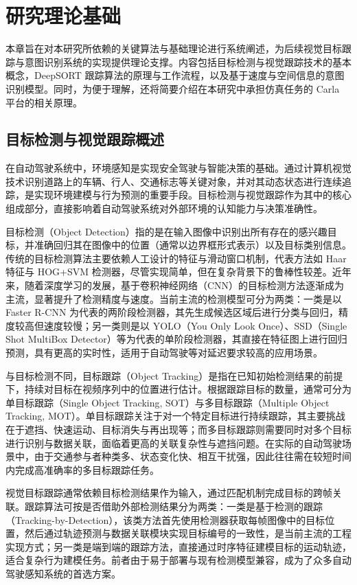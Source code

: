 \chapter{研究理论基础}

本章旨在对本研究所依赖的关键算法与基础理论进行系统阐述，为后续视觉目标跟踪与意图识别系统的实现提供理论支撑。内容包括目标检测与视觉跟踪技术的基本概念，DeepSORT 跟踪算法的原理与工作流程，以及基于速度与空间信息的意图识别模型。同时，为便于理解，还将简要介绍在本研究中承担仿真任务的 Carla 平台的相关原理。

\section{目标检测与视觉跟踪概述}

在自动驾驶系统中，环境感知是实现安全驾驶与智能决策的基础。通过计算机视觉技术识别道路上的车辆、行人、交通标志等关键对象，并对其动态状态进行连续追踪，是实现环境建模与行为预测的重要手段。目标检测与视觉跟踪作为其中的核心组成部分，直接影响着自动驾驶系统对外部环境的认知能力与决策准确性。

目标检测（Object Detection）指的是在输入图像中识别出所有存在的感兴趣目标，并准确回归其在图像中的位置（通常以边界框形式表示）以及目标类别信息。传统的目标检测算法主要依赖人工设计的特征与滑动窗口机制，代表方法如 Haar 特征与 HOG+SVM 检测器，尽管实现简单，但在复杂背景下的鲁棒性较差。近年来，随着深度学习的发展，基于卷积神经网络（CNN）的目标检测方法逐渐成为主流，显著提升了检测精度与速度。当前主流的检测模型可分为两类：一类是以 Faster R-CNN 为代表的两阶段检测器，其先生成候选区域后进行分类与回归，精度较高但速度较慢；另一类则是以 YOLO（You Only Look Once）、SSD（Single Shot MultiBox Detector）等为代表的单阶段检测器，其直接在特征图上进行回归预测，具有更高的实时性，适用于自动驾驶等对延迟要求较高的应用场景。

与目标检测不同，目标跟踪（Object Tracking）是指在已知初始检测结果的前提下，持续对目标在视频序列中的位置进行估计。根据跟踪目标的数量，通常可分为单目标跟踪（Single Object Tracking, SOT）与多目标跟踪（Multiple Object Tracking, MOT）。单目标跟踪关注于对一个特定目标进行持续跟踪，其主要挑战在于遮挡、快速运动、目标消失与再出现等；而多目标跟踪则需要同时对多个目标进行识别与数据关联，面临着更高的关联复杂性与遮挡问题。在实际的自动驾驶场景中，由于交通参与者种类多、状态变化快、相互干扰强，因此往往需在较短时间内完成高准确率的多目标跟踪任务。

视觉目标跟踪通常依赖目标检测结果作为输入，通过匹配机制完成目标的跨帧关联。跟踪算法可按是否借助外部检测结果分为两类：一类是基于检测的跟踪（Tracking-by-Detection），该类方法首先使用检测器获取每帧图像中的目标位置，然后通过轨迹预测与数据关联模块实现目标编号的一致性，是当前主流的工程实现方式；另一类是端到端的跟踪方法，直接通过时序特征建模目标的运动轨迹，适合复杂行为建模任务。前者由于易于部署与现有检测模型兼容，成为了众多自动驾驶感知系统的首选方案。

